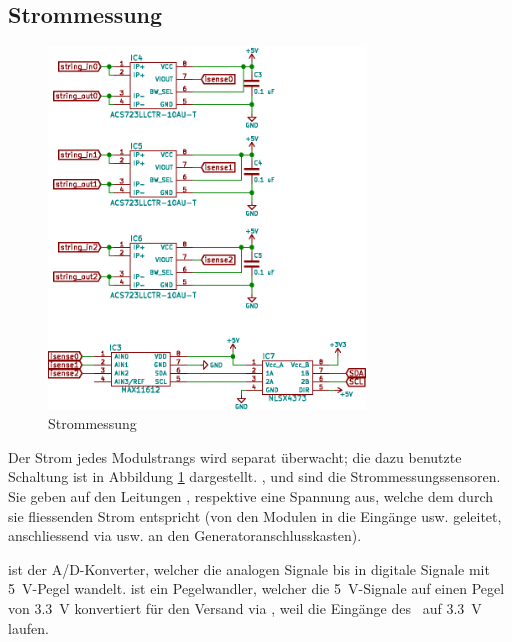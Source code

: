 \subsection{Strommessung}
\label{subsec:hw:master:current}


\begin{figure}[h!t]
    \centering
    \includegraphics[width=0.75\textwidth]{images/superv-sch/supervisor--sch--current.eps}
    \caption{Strommessung}
    \label{fig:sch:master:current}
\end{figure}


Der  Strom jedes  Modulstrangs  wird separat  \"uberwacht;  die dazu  benutzte
Schaltung   ist   in   Abbildung   \ref{fig:sch:master:current}   dargestellt.
,    und   sind  die  Strommessungssensoren. Sie
geben   auf   den    Leitungen   ,      respektive
   eine  Spannung   aus,  welche   dem  durch   sie  fliessenden
Strom  entspricht  (von  den  Modulen  in  die  Eing\"ange  
usw.   geleitet,   anschliessend   via      usw.   an   den
Generatoranschlusskasten).

 ist der A/D-Konverter,  welcher die analogen Signale 
bis    in  digitale  Signale  mit  \SI{5}{\volt}-Pegel  wandelt.
 ist  ein Pegelwandler, welcher die  \SI{5}{\volt}-Signale auf einen
Pegel von  \SI{3.3}{\volt} konvertiert  f\"ur den Versand  via \ISC,  weil die
Eing\"ange des \Raspi~auf \SI{3.3}{\volt} laufen.

